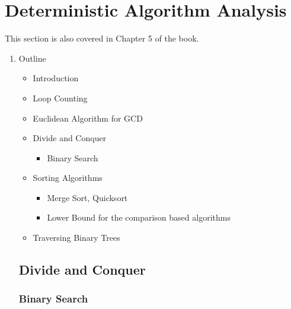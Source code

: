 

\section{Deterministic Algorithm Analysis}
This section is also covered in Chapter 5 of the book.
\begin{enumerate}
\item Outline
  \begin{itemize}
  \item Introduction
  \item Loop Counting
  \item Euclidean Algorithm for GCD
  \item Divide and Conquer
    \begin{itemize}
    \item Binary Search
    \end{itemize}
  \item Sorting Algorithms
    \begin{itemize}
    \item Merge Sort, Quicksort
    \item Lower Bound for the comparison based algorithms
    \end{itemize}
  \item Traversing Binary Trees
  \end{itemize}







\subsection{Divide and Conquer}
\subsubsection{Binary Search}
\end{enumerate}
